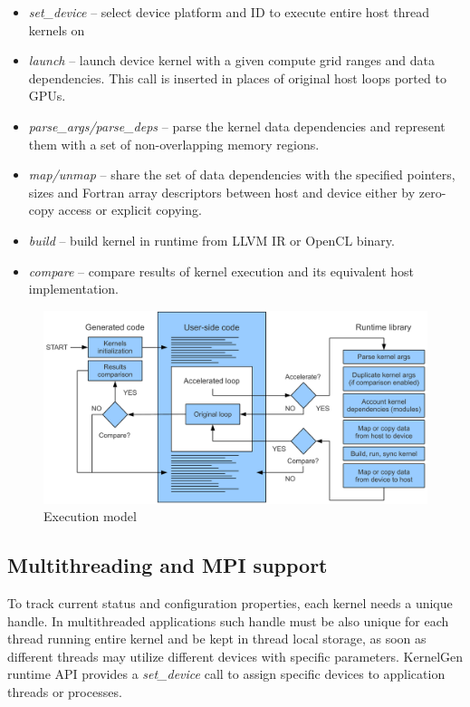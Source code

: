 \documentclass[a4,12pt]{article}
\begin{document}
\begin{itemize}
\item \emph{set\_device} -- select device platform and ID to execute entire host thread kernels on
\item \emph{launch} -- launch device kernel with a given compute grid ranges and data dependencies. This call is inserted in places of original host loops ported to GPUs.
\item \emph{parse\_args/parse\_deps} -- parse the kernel data dependencies and represent them with a set of non-overlapping memory regions.
\item \emph{map/unmap} -- share the set of data dependencies with the specified pointers, sizes and Fortran array descriptors between host and device either by zero-copy access or explicit copying.
\item \emph{build} -- build kernel in runtime from LLVM IR or OpenCL binary.
\item \emph{compare} -- compare results of kernel execution and its equivalent host implementation.
\end{itemize}

\begin{figure}
\centering
\includegraphics[scale=0.4]{figures/execution.pdf}
\caption{Execution model}
\label{fig:execution}
\end{figure}

\subsection{Multithreading and MPI support}

To track current status and configuration properties, each kernel needs a unique handle. In multithreaded applications such handle must be also unique for each thread running entire kernel and be kept in thread local storage, as soon as different threads may utilize different devices with specific parameters. KernelGen runtime API provides a \emph{set\_device} call to assign specific devices to application threads or processes.
\end{document}

